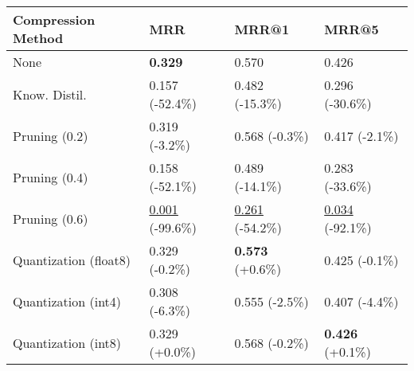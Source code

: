 \begin{tabular}{llll}
\toprule
\textbf{Compression Method} & \textbf{MRR} & \textbf{MRR@1} & \textbf{MRR@5} \\
\midrule
None & \textbf{0.329} & 0.570 & 0.426 \\
Know. Distil. & 0.157 (-52.4\%) & 0.482 (-15.3\%) & 0.296 (-30.6\%) \\
Pruning (0.2) & 0.319 (-3.2\%) & 0.568 (-0.3\%) & 0.417 (-2.1\%) \\
Pruning (0.4) & 0.158 (-52.1\%) & 0.489 (-14.1\%) & 0.283 (-33.6\%) \\
Pruning (0.6) & \underline{0.001} (-99.6\%) & \underline{0.261} (-54.2\%) & \underline{0.034} (-92.1\%) \\
Quantization (float8) & 0.329 (-0.2\%) & \textbf{0.573} (+0.6\%) & 0.425 (-0.1\%) \\
Quantization (int4) & 0.308 (-6.3\%) & 0.555 (-2.5\%) & 0.407 (-4.4\%) \\
Quantization (int8) & 0.329 (+0.0\%) & 0.568 (-0.2\%) & \textbf{0.426} (+0.1\%) \\
\bottomrule
\end{tabular}
